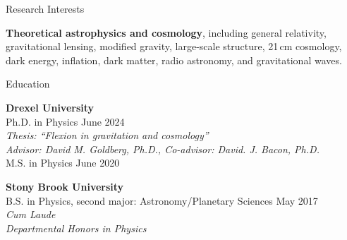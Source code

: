 \documentclass{resume} %
\begin{document}


\begin{rSection}{Research Interests}

\textbf{Theoretical astrophysics and cosmology}, including general relativity, gravitational lensing, modified gravity, large-scale structure, 21\,cm cosmology, dark energy, inflation, dark matter, radio astronomy, and gravitational waves. 

\end{rSection}


\begin{rSection}{Education}

\textbf{Drexel University} \\%
{\color{MidnightBlue} Ph.D.} in Physics \hfill {June 2024} \\
\textit{Thesis: ``Flexion in gravitation and cosmology''}\\
\textit{Advisor: David M. Goldberg, Ph.D., Co-advisor: David. J. Bacon, Ph.D.}\\
{\color{MidnightBlue} M.S.} in Physics \hfill{June 2020}%

\textbf{Stony Brook University} \\%
{\color{MidnightBlue} B.S.} in Physics, second major: Astronomy/Planetary Sciences \hfill{May 2017}\\%
\textit{Cum Laude}\\
\textit{Departmental Honors in Physics}

\end{rSection}

\end{document}
